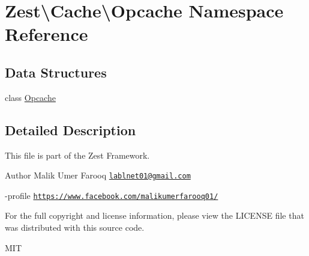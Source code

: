 \hypertarget{namespace_zest_1_1_cache_1_1_opcache}{}\section{Zest\textbackslash{}Cache\textbackslash{}Opcache Namespace Reference}
\label{namespace_zest_1_1_cache_1_1_opcache}
\subsection*{Data Structures}
\begin{DoxyCompactItemize}
\item 
class \mbox{\hyperlink{class_zest_1_1_cache_1_1_opcache_1_1_opcache}{Opcache}}
\end{DoxyCompactItemize}


\subsection{Detailed Description}
This file is part of the Zest Framework.

\begin{DoxyAuthor}{Author}
Malik Umer Farooq \href{mailto:lablnet01@gmail.com}{\tt lablnet01@gmail.\+com} 

-\/profile \href{https://www.facebook.com/malikumerfarooq01/}{\tt https\+://www.\+facebook.\+com/malikumerfarooq01/}
\end{DoxyAuthor}
For the full copyright and license information, please view the L\+I\+C\+E\+N\+SE file that was distributed with this source code.

M\+IT 